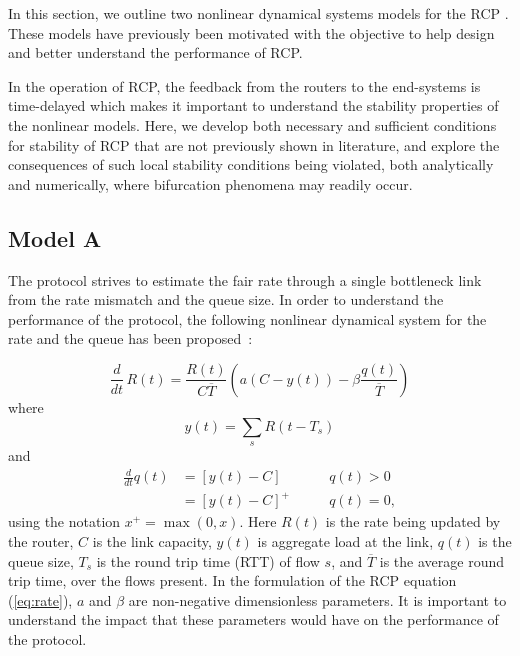 \documentclass[conference]{IEEEtran}
\begin{document}
In this section, we outline two nonlinear dynamical systems models for the RCP \cite{nanswitch, krv}. These models have previously been motivated with the objective to 
help design and better understand the performance of RCP.

In the operation of RCP, the feedback from the routers to the end-systems is time-delayed which makes 
it important to understand the stability properties of the nonlinear models. 
Here, we develop both necessary and sufficient conditions for stability of RCP that are not previously shown in literature, and explore the 
consequences of such local stability conditions being violated, both analytically and numerically,
where bifurcation phenomena may readily occur.

\subsection{Model A}

The protocol strives to estimate the fair rate through a single bottleneck link from the rate mismatch 
and the queue size. In order to understand the performance of the protocol, the following nonlinear 
dynamical system for the rate and the queue has been proposed~\cite{nanswitch, FCT}:

\begin{equation}
\frac{d}{dt}\, R(t)= \frac{ R(t)}{C \overline{T}}
\left( a (C - y(t)) - \beta \frac{ q(t)}{ \overline{T}}
\right)
\label{eq:rate}
\end{equation}
where
\begin{equation}
y(t) = \sum_{s} R(t-T_{s})
\label{eq:y}
\end{equation}
and
\begin{equation}
\label{eq:queue}
\begin{aligned}
\frac{d}{dt}q\left(t\right) & = \left[y\left(t\right) - C\right] &\qquad q\left(t\right) > 0\,\\
&= \left[y\left(t\right) - C\right]^{+} &\qquad q\left(t\right) = 0,
\end{aligned}
\end{equation}
using the notation $x^{+} = \max(0, x)$.
Here $R(t)$ is the rate being updated by the router,
$C$ is the link capacity,
$y(t)$ is aggregate load at the link,
$q(t)$ is the queue size,
$T_s$ is the round trip time (RTT) of flow $s$,
and $\overline{T}$ is the average round trip time,
over the flows present. In the formulation of the RCP equation (\ref{eq:rate}), $a$ and $\beta$ are non-negative dimensionless parameters. It is important to understand the impact that these parameters would have on the performance of the protocol.  
\end{document}
